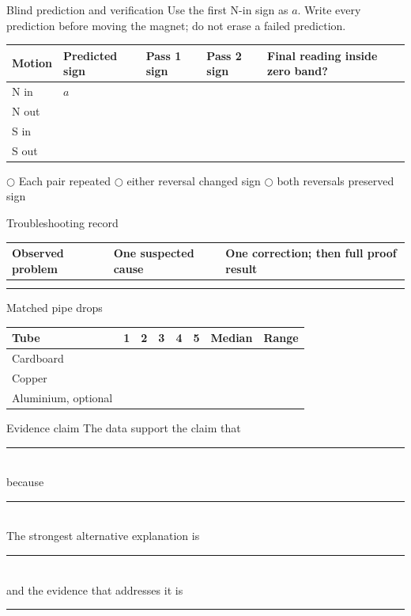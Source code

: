\clearpage
{}

\begin{teloscard}{Blind prediction and verification}
Use the first N-in sign as \(a\). Write every prediction before moving the
magnet; do not erase a failed prediction.
\small
\begin{tabularx}{\linewidth}{@{}p{.15\linewidth}p{.16\linewidth}p{.16\linewidth}p{.16\linewidth}L@{}}
\toprule
Motion & Predicted sign & Pass 1 sign & Pass 2 sign & Final reading inside zero band?\\
\midrule
N in & \(a\) & & & \\[1.4em]
N out & & & & \\[1.4em]
S in & & & & \\[1.4em]
S out & & & & \\[1.4em]
\bottomrule
\end{tabularx}
\normalsize
\medskip
\(\bigcirc\) Each pair repeated \quad
\(\bigcirc\) either reversal changed sign \quad
\(\bigcirc\) both reversals preserved sign
\end{teloscard}

\begin{teloscard}{Troubleshooting record}
\begin{tabularx}{\linewidth}{@{}p{.28\linewidth}p{.28\linewidth}L@{}}
\toprule
Observed problem & One suspected cause & One correction; then full proof result\\
\midrule
 & & \\[2.1em]
 & & \\[2.1em]
\bottomrule
\end{tabularx}
\end{teloscard}

\begin{teloscard}{Matched pipe drops}
\small
\begin{tabularx}{\linewidth}{@{}p{.22\linewidth}*{5}{C}p{.14\linewidth}p{.14\linewidth}@{}}
\toprule
Tube & 1 & 2 & 3 & 4 & 5 & Median & Range\\
\midrule
Cardboard & & & & & & & \\[1.4em]
Copper & & & & & & & \\[1.4em]
Aluminium, optional & & & & & & & \\[1.4em]
\bottomrule
\end{tabularx}
\normalsize
\end{teloscard}

\begin{telospanel}{Evidence claim}
The data support the claim that \rule{.71\linewidth}{.35pt}\\[1em]
because \rule{.89\linewidth}{.35pt}\\[1em]
The strongest alternative explanation is \rule{.57\linewidth}{.35pt}\\[1em]
and the evidence that addresses it is \rule{.55\linewidth}{.35pt}
\end{telospanel}

